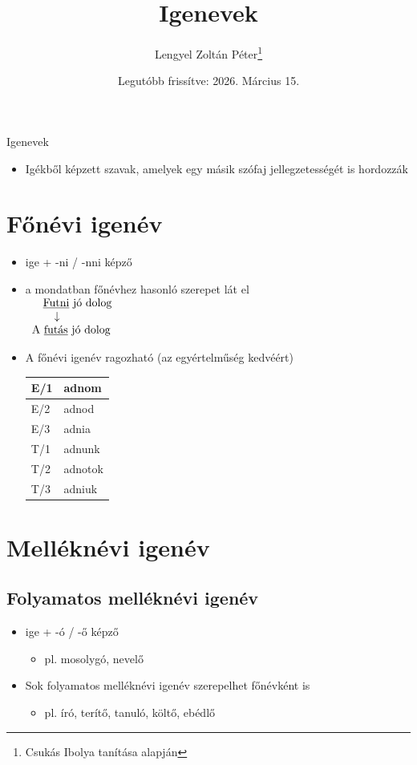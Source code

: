 \documentclass{article}
\title{Igenevek}
\author{Lengyel Zoltán Péter\thanks{Csukás Ibolya tanítása alapján}}
\date{Legutóbb frissítve: 2026. Március 15.}
\begin{document}
\maketitle
\tableofcontents
\newpage

\begin{center}
    {\Huge Igenevek}
\end{center}
\begin{itemize}
    \item Igékből képzett szavak, amelyek egy másik szófaj jellegzetességét is hordozzák
\end{itemize}

\section{Főnévi igenév}
\begin{itemize}
    \item ige + -ni / -nni képző
    \item a mondatban főnévhez hasonló szerepet lát el \\
    $\begin{array}{l}
    \quad\text{\underline{Futni} jó dolog } \\
    \quad\quad\downarrow \\
    \text{A \underline{futás} jó dolog}
    \end{array}$
    \item A főnévi igenév ragozható (az egyértelműség kedvéért) \\
    \begin{tabular}{|l|l|} \hline
        E/1 & adnom \\ \hline
        E/2 & adnod \\ \hline
        E/3 & adnia \\  \hline
        T/1 & adnunk \\ \hline
        T/2 & adnotok \\ \hline
        T/3 & adniuk \\ \hline
    \end{tabular}
\end{itemize}

\section{Melléknévi igenév}
\subsection{Folyamatos melléknévi igenév}
\begin{itemize}
    \item ige + -ó / -ő képző
    \begin{itemize}
        \item pl. mosolygó, nevelő
    \end{itemize}
    \item Sok folyamatos melléknévi igenév szerepelhet főnévként is 
    \begin{itemize}
        \item pl. író, terítő, tanuló, költő, ebédlő
    \end{itemize}
\end{itemize}
\end{document}
